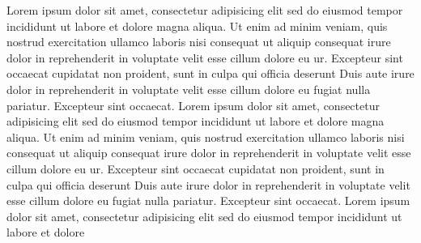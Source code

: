 \documentclass[a4paper, oneside, notitlepage, 12pt]{article}
\title{}
\date{}
\author{}
\begin{document}
\tableofcontents

\begin{pages}

\begin{Leftside}
\beginnumbering
{}
Lorem ipsum dolor sit amet, consectetur adipisicing elit
sed do eiusmod tempor incididunt ut labore et dolore
magna aliqua. Ut enim ad minim veniam, quis nostrud
exercitation ullamco laboris nisi
 consequat ut aliquip consequat\pend[]
 irure dolor in reprehenderit
in voluptate velit esse cillum dolore eu ur. Excepteur sint occaecat
cupidatat non proident, sunt in culpa qui officia deserunt
Duis aute irure dolor in reprehenderit
in voluptate velit esse cillum dolore eu fugiat nulla
pariatur. Excepteur sint occaecat.
\pend
{}
Lorem ipsum dolor sit amet, consectetur adipisicing elit
sed do eiusmod tempor incididunt ut labore et dolore
magna aliqua. Ut enim ad minim veniam, quis nostrud
exercitation ullamco laboris nisi
 consequat ut aliquip consequat\pend[]
 irure dolor in reprehenderit
in voluptate velit esse cillum dolore eu ur. Excepteur sint occaecat
cupidatat non proident, sunt in culpa qui officia deserunt
Duis aute irure dolor in reprehenderit
in voluptate velit esse cillum dolore eu fugiat nulla
pariatur. Excepteur sint occaecat.
\pend
{}
Lorem ipsum dolor sit amet, consectetur adipisicing elit
sed do eiusmod tempor incididunt ut labore et dolore

\end{Leftside}
\end{pages}
\end{document}
